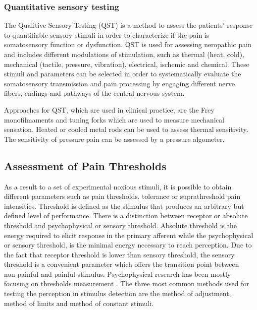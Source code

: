 \subsubsection{Quantitative sensory testing}
The Qualitive Sensory Testing (QST) is a method to assess the patients' response to quantifiable sensory stimuli in order to characterize if the pain is somatosensory function or dysfunction. QST is used for assessing neropathic pain and includes different modulations of stimulation, such as thermal (heat, cold), mechanical (tactile, pressure, vibration), electrical, ischemic and chemical. These stimuli and parameters can be selected in order to systematically evaluate the somatosensory transmission and pain processing by engaging different nerve fibers, endings and pathways of the central nervous system. \cite{Fillingim2016} 

Approaches for QST, which are used in clinical practice, are the Frey monofilmaments and tuning forks which are used to measure mechanical sensation. Heated or cooled metal rods can be used to assess thermal sensitivity. The sensitivity of pressure pain can be assessed by a pressure algometer. \cite{Fillingim2016}


\subsection{Assessment of Pain Thresholds}
As a result to a set of experimental noxious stimuli, it is possible to obtain different parameters such as pain thresholds, tolerance or suprathreshold pain intensities. Threshold is defined as the stimulus that produces an arbitrary but defined level of performance. There is a distinction between receptor or absolute threshold and psychophysical or sensory threshold. Absolute threshold is the energy required to elicit response in the primary afferent while the psychophysical or sensory threshold, is the minimal energy necessary to reach perception. Due to the fact that receptor threshold is lower than sensory threshold, the sensory threshold is a convenient parameter which offers the transition point between non-painful and painful stimulus. \cite{Yarnitsky2006}
Psychophysical research has been mostly focusing on thresholds measurement \cite{Pelli2010}. The three most common methods used for testing the perception in stimulus detection are the method of adjustment, method of limits and method of constant stimuli.


